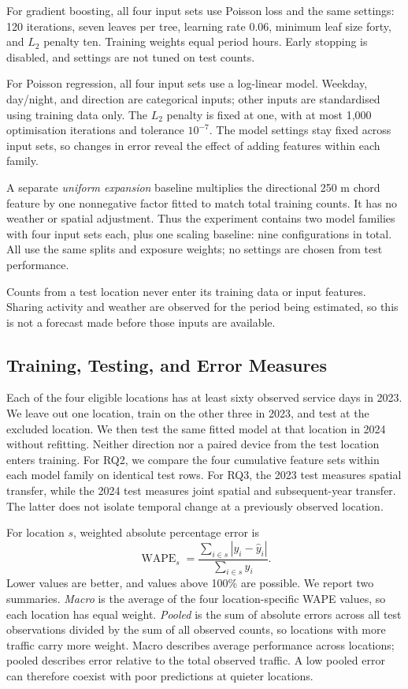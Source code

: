\documentclass{interact}
\newcommand{\WAPE}{\operatorname{WAPE}}
\begin{document}
For gradient boosting, all four input sets use Poisson loss and the same settings: 120 iterations, seven leaves per tree, learning rate 0.06, minimum leaf size forty, and $L_2$ penalty ten. Training weights equal period hours. Early stopping is disabled, and settings are not tuned on test counts.

For Poisson regression, all four input sets use a log-linear model. Weekday, day/night, and direction are categorical inputs; other inputs are standardised using training data only. The $L_2$ penalty is fixed at one, with at most 1,000 optimisation iterations and tolerance $10^{-7}$. The model settings stay fixed across input sets, so changes in error reveal the effect of adding features within each family.

A separate \emph{uniform expansion} baseline multiplies the directional 250 m chord feature by one nonnegative factor fitted to match total training counts. It has no weather or spatial adjustment. Thus the experiment contains two model families with four input sets each, plus one scaling baseline: nine configurations in total. All use the same splits and exposure weights; no settings are chosen from test performance.

Counts from a test location never enter its training data or input features. Sharing activity and weather are observed for the period being estimated, so this is not a forecast made before those inputs are available.

\subsection{Training, Testing, and Error Measures}
\label{sec:evaluation}
Each of the four eligible locations has at least sixty observed service days in 2023. We leave out one location, train on the other three in 2023, and test at the excluded location. We then test the same fitted model at that location in 2024 without refitting. Neither direction nor a paired device from the test location enters training. For RQ2, we compare the four cumulative feature sets within each model family on identical test rows. For RQ3, the 2023 test measures spatial transfer, while the 2024 test measures joint spatial and subsequent-year transfer. The latter does not isolate temporal change at a previously observed location.

For location $s$, weighted absolute percentage error is
\begin{equation}
 \WAPE_s=\frac{\sum_{i\in s}|y_i-\widehat y_i|}{\sum_{i\in s}y_i}.
\end{equation}
Lower values are better, and values above 100\%{} are possible. We report two summaries. \emph{Macro} is the average of the four location-specific WAPE values, so each location has equal weight. \emph{Pooled} is the sum of absolute errors across all test observations divided by the sum of all observed counts, so locations with more traffic carry more weight. Macro describes average performance across locations; pooled describes error relative to the total observed traffic. A low pooled error can therefore coexist with poor predictions at quieter locations.
\end{document}
